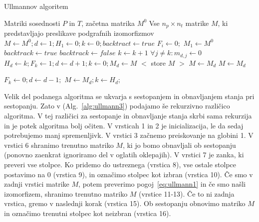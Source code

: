 \documentclass[a4paper, 12pt, ]{book}
\newcommand{\refalg}[1]{(Alg.~\ref{#1})}
\begin{document}
\begin{algorithm}
\caption{Ullmannov algoritem}
\label{alg:ullmann1}
\begin{algorithmic}[1]
	\Require Matriki sosednosti $P$ in $T$, začetna matrika $M^0$
	\Ensure Vse $n_p \times n_t$ matrike $M$, ki predstavljajo preslikave podgrafnih izomorfizmov				
	\State $M \gets M^0; d \gets 1; H_1 \gets 0; k \gets 0; backtract \gets true$								
	 $F_i \gets 0;$ \EndFor													
	\State $M_1 \gets M^0$																	
		\State $backtrack \gets true$													
			\State $backtrack \gets false$
			\Repeat 
				\State $k \gets k +1$ 															
			\State $\forall j \not = k : m_{d,j} \gets 0$										\label{alg:ullmann1.11}
					\State $H_d \gets k; F_k \gets 1; d \gets d+1; k \gets 0; M_d \gets M$
				\Else																			
						\State $<$ store $M$ $>$
					\EndIf													
						\State $M \gets M_d$		
				\EndIf
			\Else
				\State $M \gets M_d$
			\EndIf
		\EndIf
		
			\State $F_k \gets 0; d \gets d-1;$													
				\State $M \gets M_d; k \gets H_d;$												
			\EndIf
		\EndIf
	\EndWhile
\end{algorithmic}
\end{algorithm}

	Velik del podanega algoritma se ukvarja s sestopanjem in obnavljanjem stanja pri sestopanju. Zato v \refalg{alg:ullmann3} podajamo še rekurzivno 
	različico algoritma. V tej različici za sestopanje in obnavljanje stanja skrbi sama rekurzija in je potek algoritma bolj očiten. V vrsticah 1 in 2 je
	inicializacija, le da sedaj potrebujemo manj spremenljivk. V vrstici 3 začnemo preiskovanje na globini 1. V vrstici 6 shranimo trenutno matriko $M$,
	ki jo bomo obnavljali ob sestopanju (ponovno zaenkrat ignoriramo del v oglatih oklepajih). V vrstici 7 je zanka, ki preveri vse stolpce. Ko pridemo do
	ustreznega (vrstica 8), vse ostale stolpce postavimo na 0 (vrstica 9), in označimo stolpec kot izbran (vrstica 10). Če smo v zadnji vrstici matrike $M$,
	potem preverimo pogoj~\ref{eq:ullmann1} in če smo našli izomorfizem, shranimo trenutno matriko $M$ (vrstice 11-13). Če to ni zadnja vrstica, gremo
	v naslednji korak (vrstica 15). Ob sestopanju obnovimo matriko $M$ in označimo trenutni stolpec kot neizbran (vrstica 16).
\end{document}
